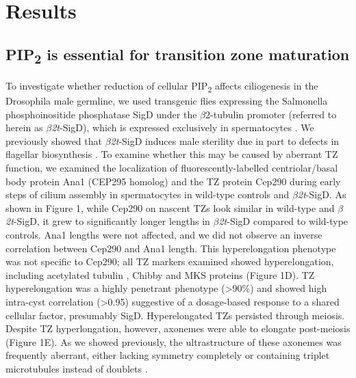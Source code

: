 \documentclass[12pt, twoside, letterpaper]{article}
\newcommand{\PIP}{PIP\textsubscript{2}}
\newcommand{\sigd}{$\beta$\textit{2t}-SigD}
\begin{document}
\section{Results}
\subsection{\PIP{} is essential for transition zone maturation}
To investigate whether reduction of cellular \PIP{} affects ciliogenesis in the
Drosophila male germline,
we used transgenic flies expressing the Salmonella phosphoinositide phosphatase SigD
under the $\beta$2-tubulin promoter (referred to herein as \sigd{}),
which is expressed exclusively in spermatocytes
\citep{wei2008depletion, fabian2010phosphatidylinositol}.
We previously showed that \sigd{} induces male sterility
due in part to defects in flagellar biosynthesis \citep{wei2008depletion}.
To examine whether this may be caused by aberrant TZ function,
we examined the localization of fluorescently-labelled
centriolar/basal body protein
Ana1 (CEP295 homolog) \citep{goshima2007genes, blachon2009proximal}
and the TZ protein Cep290 \citep{basiri2014migrating}
during early steps of cilium assembly in spermatocytes in
wild-type controls and \sigd{}.
As shown in Figure 1,
while Cep290 on nascent TZs look similar in wild-type and \sigd{}, 
it grew to significantly longer lengths in \sigd{}
compared to wild-type controls.
Ana1 lengths were not affected, and we did not observe an inverse
correlation between Cep290 and Ana1 length.
This hyperelongation phenotype was not specific to Cep290;
all TZ markers examined showed hyperelongation, including
acetylated tubulin \citep{gottardo2013cilium},
Chibby \citep{enjolras2012drosophila} and
MKS \citep{slaats2015mks1, vieillard2016transition} proteins (Figure 1D).
TZ hyperelongation was a highly penetrant phenotype (\textgreater 90\%)
and showed high intra-cyst correlation (\textgreater 0.95) suggestive
of a dosage-based response to a shared cellular factor,
presumably SigD.
Hyperelongated TZs persisted through meiosis.
Despite TZ hyperlongation, however, axonemes were able to
elongate post-meiosis (Figure 1E).
As we showed previously, the ultrastructure of these axonemes
was frequently aberrant,
either lacking symmetry completely or containing triplet microtubules
instead of doublets \citep{wei2008depletion}.
\end{document}
